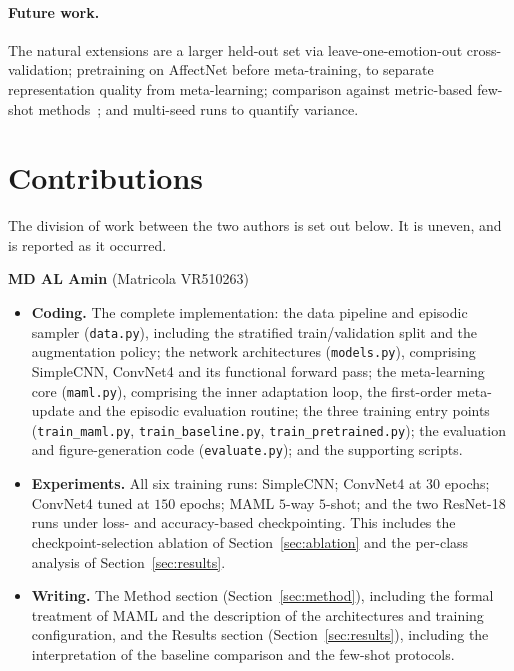 \documentclass[11pt,a4paper]{article}
\begin{document}
\paragraph{Future work.}
The natural extensions are a larger held-out set via leave-one-emotion-out
cross-validation; pretraining on AffectNet before meta-training, to separate
representation quality from meta-learning; comparison against metric-based
few-shot methods~\cite{snell2017prototypical}; and multi-seed runs to quantify
variance.

\section{Contributions}
\label{sec:contributions}

The division of work between the two authors is set out below. It is uneven,
and is reported as it occurred.

\vspace{0.25cm}
\noindent
\textbf{MD AL Amin} (Matricola VR510263)

\begin{itemize}\itemsep2pt
\item \textbf{Coding.} The complete implementation: the data pipeline and
episodic sampler (\texttt{data.py}), including the stratified train/validation
split and the augmentation policy; the network architectures
(\texttt{models.py}), comprising SimpleCNN, ConvNet4 and its functional forward
pass; the meta-learning core (\texttt{maml.py}), comprising the inner
adaptation loop, the first-order meta-update and the episodic evaluation
routine; the three training entry points (\texttt{train\_maml.py},
\texttt{train\_baseline.py}, \texttt{train\_pretrained.py}); the evaluation and
figure-generation code (\texttt{evaluate.py}); and the supporting scripts.

\item \textbf{Experiments.} All six training runs: SimpleCNN; ConvNet4 at
$30$ epochs; ConvNet4 tuned at $150$ epochs; MAML $5$-way $5$-shot; and the two
ResNet-18 runs under loss- and accuracy-based checkpointing. This includes the
checkpoint-selection ablation of Section~\ref{sec:ablation} and the per-class
analysis of Section~\ref{sec:results}.

\item \textbf{Writing.} The Method section (Section~\ref{sec:method}),
including the formal treatment of MAML and the description of the
architectures and training configuration, and the Results section
(Section~\ref{sec:results}), including the interpretation of the baseline
comparison and the few-shot protocols.
\end{itemize}
\end{document}
